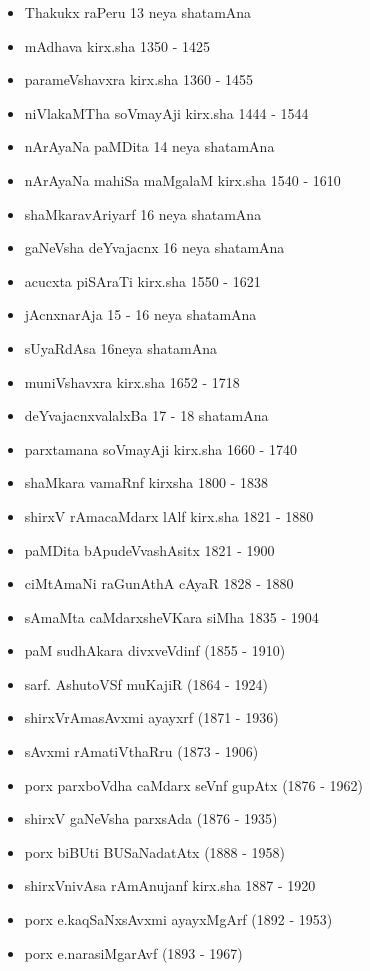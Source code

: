 {\begin{itemize}
\item Thakukx raPeru {\rm 13} neya shatamAna
\item mAdhava kirx.sha {\rm 1350 - 1425}
\item parameVshavxra kirx.sha {\rm 1360 - 1455}
\item niVlakaMTha soVmayAji kirx.sha {\rm 1444 - 1544}
\item nArAyaNa paMDita {\rm 14} neya shatamAna
\item nArAyaNa mahiSa maMgalaM kirx.sha {\rm 1540 - 1610}
\item shaMkaravAriyarf {\rm 16} neya shatamAna
\item gaNeVsha deYvajacnx {\rm 16} neya shatamAna
\item acucxta piSAraTi kirx.sha {\rm 1550 - 1621}
\item jAcnxnarAja {\rm 15 - 16} neya shatamAna
\item sUyaRdAsa {\rm 16}neya shatamAna
\item muniVshavxra kirx.sha {\rm 1652 - 1718}
\item deYvajacnxvalalxBa {\rm 17 - 18} shatamAna
\item parxtamana soVmayAji kirx.sha {\rm 1660 - 1740}
\item shaMkara vamaRnf kirxsha {\rm 1800 - 1838}
\item shirxV rAmacaMdarx lAlf kirx.sha {\rm 1821 - 1880}
\item paMDita bApudeVvashAsitx {\rm 1821 - 1900}
\item ciMtAmaNi raGunAthA cAyaR {\rm 1828 - 1880}
\item sAmaMta caMdarxsheVKara siMha {\rm 1835 - 1904}
\item paM sudhAkara divxveVdinf {\rm (1855 - 1910)}
\item sarf. AshutoVSf muKajiR {\rm (1864 - 1924)}
\item shirxVrAmasAvxmi ayayxrf {\rm (1871 - 1936)}
\item sAvxmi rAmatiVthaRru {\rm (1873 - 1906)}
\item porx parxboVdha caMdarx seVnf gupAtx {\rm (1876 - 1962)}
\item shirxV gaNeVsha parxsAda {\rm (1876 - 1935)}
\item porx biBUti BUSaNadatAtx {\rm (1888 - 1958)}
\item shirxVnivAsa rAmAnujanf kirx.sha {\rm 1887 - 1920}
\item porx e.kaqSaNxsAvxmi ayayxMgArf {\rm (1892 - 1953)}
\item porx e.narasiMgarAvf {\rm (1893 - 1967)}

\end{itemize}}
